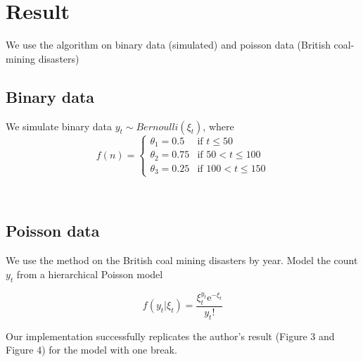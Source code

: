 \documentclass{article}
\begin{document}
    \section{Result}\label{result}

We use the algorithm on binary data (simulated) and poisson data
(British coal-mining disasters)

    \subsection{Binary data}\label{binary-data}

We simulate binary data $y_t \sim Bernoulli(\xi_t)$, where \[
f(n) = \begin{cases} 
\theta_1 = 0.5 &\mbox{if } t \leq 50 \\
\theta_2 = 0.75 & \mbox{if } 50 < t \leq 100 \\
\theta_3 = 0.25 & \mbox{if } 100 < t \leq 150\end{cases}
\]



    \begin{center}
    \end{center}
    { \hspace*{\fill} \\}
    
    \subsection{Poisson data}\label{poisson-data}

We use the method on the British coal mining disasters by year. Model
the count $y_t$ from a hierarchical Poisson model

\[f(y_t | \xi_t) = \frac{\xi_t^{y_t} \text{e}^{-\xi_t}}{y_t!}\]

Our implementation successfully replicates the author's result (Figure 3
and Figure 4) for the model with one break.



    \begin{center}
    \end{center}
    { \hspace*{\fill} \\}
    

    \begin{center}
    \end{center}
    { \hspace*{\fill} \\}
    
\end{document}
